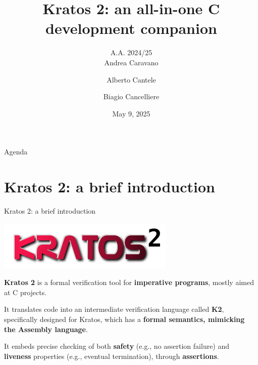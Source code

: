 \documentclass[aspectratio=1610,10.5pt]{beamer} %
\begin{document}
\title{\textbf{Kratos 2: an all-in-one C development companion}}
\author{A.A. 2024/25\\Andrea Caravano\and Alberto Cantele\and Biagio Cancelliere}
\date{May 9, 2025}


\begin{frame}
    \titlepage
\end{frame}

\begin{frame}{Agenda}
    \tableofcontents
\end{frame}

\logo{} %

\section{Kratos 2: a brief introduction}
\begin{frame}{Kratos 2: a brief introduction}
    \begin{center}
        \includegraphics[height=%
        0.15\textheight]{../res/logo-kratos}
    \end{center}

    \textbf{Kratos 2} is a formal verification tool for \textbf{imperative programs}, mostly aimed at C projects.

    \smallskip

    It translates code into an intermediate verification language called \textbf{K2}, specifically designed for Kratos, which has a \textbf{formal semantics, mimicking the Assembly language}.

    \smallskip

    It embeds precise checking of both \textbf{safety} (e.g., no assertion failure) and \textbf{liveness} properties (e.g., eventual termination), through \textbf{assertions}.
\end{frame}
\end{document}
